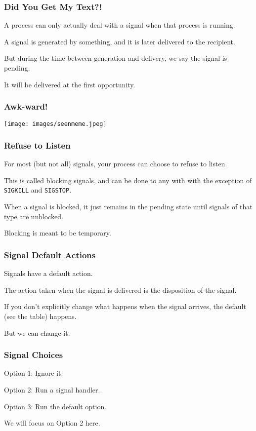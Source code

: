 \begin{frame}
	\frametitle{Did You Get My Text?!}

	A process can only actually deal with a signal when that process is running.

	A signal is generated by something, and it is later delivered to the recipient.

	But during the time between generation and delivery, we say the signal is \alert{pending}.

	It will be delivered at the first opportunity.

\end{frame}


\begin{frame}
	\frametitle{Awk-ward!}

	\begin{center}
		\texttt{[image: images/seenmeme.jpeg]}
	\end{center}

\end{frame}


\begin{frame}
	\frametitle{Refuse to Listen}

	For most (but not all) signals, your process can choose to refuse to listen.

	This is called blocking signals, and can be done to any with with the exception of \texttt{SIGKILL} and \texttt{SIGSTOP}.

	When a signal is blocked, it just remains in the pending state until signals of that type are unblocked.

	Blocking is meant to be temporary.

\end{frame}


\begin{frame}
	\frametitle{Signal Default Actions}

	Signals have a default action.

	The action taken when the signal is delivered is the \alert{disposition} of the signal.

	If you don't explicitly change what happens when the signal arrives, the default (see the table) happens.

	But we can change it.

\end{frame}


\begin{frame}
	\frametitle{Signal Choices}

	Option 1: Ignore it.

	Option 2: Run a signal handler.

	Option 3: Run the default option.

	We will focus on Option 2 here.

\end{frame}


